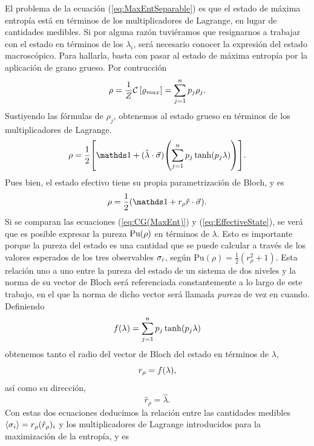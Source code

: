 El problema de la ecuación (\ref{eq:MaxEntSeparable}) es que el estado de máxima entropía está en términos de los multiplicadores de Lagrange, en lugar de cantidades medibles. Si por alguna razón tuviéramos que resignarnos a trabajar con el estado en términos de los $\lambda_{i}$, será necesario conocer la expresión del estado macroscópico. Para hallarla, basta con pasar al estado de máxima entropía por la aplicación de grano grueso. Por contrucción 
\begin{equation*}
    \rho=\frac{1}{Z}\mathcal{C}\left[\varrho_{max}\right]=\sum_{j=1}^{n}p_{j}\rho_{j}.
\end{equation*}
Sustiyendo las fórmulas de $\rho_{j}$, obtenemos al estado grueso en términos de los multiplicadores de Lagrange.
\begin{equation}\label{eq:CG(MaxEnt)}
  \rho=\frac{1}{2}\qty[\Id+(\paulivec{\lambda})\qty(\sum_{j=1}^{n}p_{j}\tanh(p_{j}\lambda))].
\end{equation}
Pues bien, el estado efectivo tiene su propia parametrización de Bloch, y es
\begin{equation}\label{eq:EffectiveState}
    \rho=\frac{1}{2}(\Id+r_{\rho}\paulivec{r}).
\end{equation}
Si se comparan las ecuaciones (\ref*{eq:CG(MaxEnt)}) y (\ref*{eq:EffectiveState}), se verá que es posible expresar la pureza $\text{Pu}(\rho)$ en términos de $\lambda$. Esto es importante porque la pureza del estado es una cantidad que se puede calcular a través de los valores esperados de los tres observables $\sigma_{i}$, según $\text{Pu}(\rho)=\frac{1}{2}(r_{\rho}^{2}+1)$. Esta relación uno a uno entre la pureza del estado de un sistema de dos niveles y la norma de su vector de Bloch será referenciada constantemente a lo largo de este trabajo, en el que la norma de dicho vector será llamada \textit{pureza} de vez en cuando. Definiendo
\begin{equation}\label{eq:r(lambda)}
    f(\lambda)=\sum_{j=1}^{n}p_{j}\tanh(p_{j}\lambda)
\end{equation}
obtenemos tanto el radio del vector de Bloch del estado en términos de $\lambda$,
\begin{equation*}
    r_{\rho}=f(\lambda),
\end{equation*}
así como su dirección,
\begin{equation*}
    \hat{r}_{\rho}=\hat{\lambda}.
\end{equation*}
Con estas dos ecuaciones deducimos la relación entre las cantidades medibles $\expval{\sigma_{i}}=r_{\rho}(\hat{r}_{\rho})_{i}$ y los multiplicadores de Lagrange introducidos para la maximización de la entropía, y es
